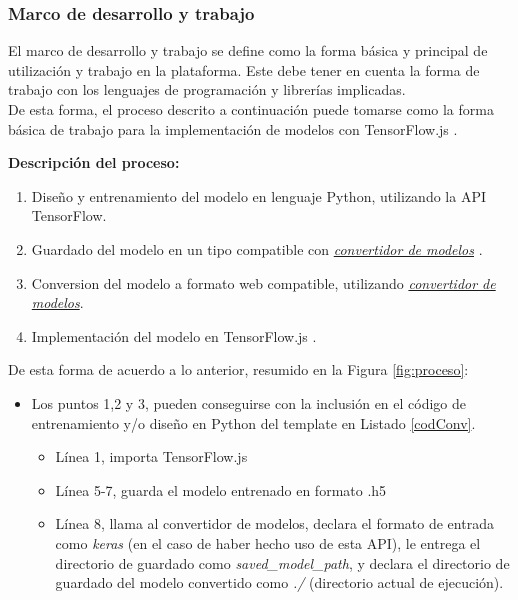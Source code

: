 \subsubsection{Marco de desarrollo y trabajo}

El marco de desarrollo y trabajo se define como la forma básica y principal de utilización y trabajo en la plataforma. Este debe tener en cuenta la forma de trabajo con los lenguajes de programación y librerías implicadas. \\
De esta forma, el proceso descrito a continuación puede tomarse como la forma básica de trabajo para la implementación de modelos con TensorFlow.js .

\textbf{Descripción del proceso:}
\vspace{-0.4cm}
\begin{enumerate}
  \item Diseño y entrenamiento del modelo en lenguaje Python, utilizando la API TensorFlow.
  \item Guardado del modelo en un tipo compatible con \href{https://github.com/tensorflow/tfjs/tree/master/tfjs-converter}{\emph{convertidor de modelos}} \cite{TensorflowTfjs}.
  \item Conversion del modelo a formato web compatible, utilizando \href{https://github.com/tensorflow/tfjs/tree/master/tfjs-converter}{\emph{convertidor de modelos}}.
  \item Implementación del modelo en TensorFlow.js .
\end{enumerate}

\vspace{-0.2cm}
De esta forma de acuerdo a lo anterior, resumido en la Figura \ref{fig:proceso}:
\vspace{-0.4cm}
\begin{itemize}
  \item Los puntos 1,2 y 3, pueden conseguirse con la inclusión en el código de entrenamiento y/o diseño en Python del template en Listado \ref{codConv}.
  \begin{itemize}
    \item Línea 1, importa TensorFlow.js
    \item Línea 5-7, guarda el modelo entrenado en formato .h5
    \item Línea 8, llama al convertidor de modelos, declara el formato de entrada como \emph{keras} (en el caso de haber hecho uso de esta API), le entrega el directorio de guardado como \emph{saved\_model\_path}, y declara el directorio de guardado del modelo convertido como \emph{./} (directorio actual de ejecución).
  \end{itemize}
\end{itemize}



